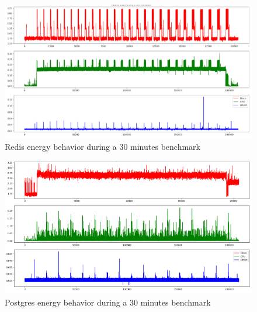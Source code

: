         
    \begin{figure}[h]
        \centering
        \includegraphics[width=1\columnwidth]{results/grafostempo/redis10m.png}
        \caption{Redis energy behavior during a 30 minutes benchmark}
        \label{fig:redistime30m}
    \end{figure}
    
    
        
    \begin{figure}[h]

        \centering
        \includegraphics[width=1\columnwidth]{results/grafostempo/postgres10m.png}
        \caption{Postgres energy behavior during a 30 minutes benchmark}
        \label{fig:PostGrestime30m}
    \end{figure}
